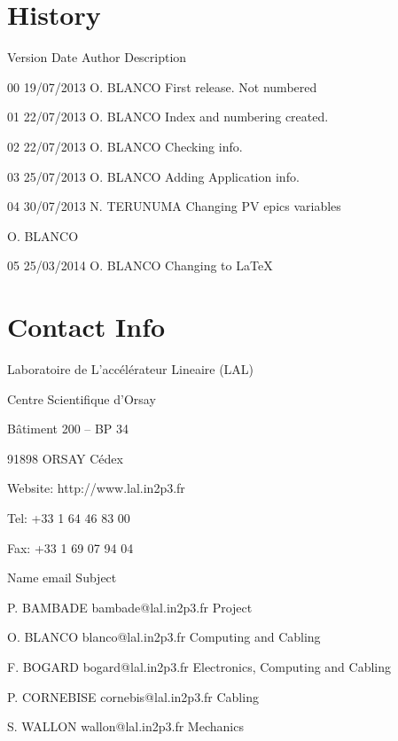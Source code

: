 \documentclass[a4paper,11pt]{book}
\begin{document}
\section{History}
Version	Date			Author		Description\par 
00		19/07/2013	O. BLANCO	First release. Not numbered\par 
01		22/07/2013	O. BLANCO	Index and numbering created.\par 
02		22/07/2013	O. BLANCO	Checking info.\par 
03		25/07/2013	O. BLANCO	Adding Application info.\par 
04		30/07/2013	N. TERUNUMA	Changing PV epics variables\par 
					O. BLANCO\par 
05		25/03/2014	O. BLANCO	Changing to LaTeX\par

\section{Contact Info}
Laboratoire de L'accélérateur Lineaire (LAL)\par 
Centre Scientifique d'Orsay\par 
Bâtiment 200 – BP 34\par 
91898 ORSAY Cédex\par 
Website: http://www.lal.in2p3.fr\par 
Tel: 	+33 1 64 46 83 00\par 
Fax: 	+33 1 69 07 94 04\par 

Name			email				Subject\par 
P. BAMBADE	bambade@lal.in2p3.fr	Project\par 
O. BLANCO		blanco@lal.in2p3.fr	Computing and Cabling\par 
F. BOGARD		bogard@lal.in2p3.fr	Electronics, Computing and Cabling\par 
P. CORNEBISE	cornebis@lal.in2p3.fr	Cabling\par 
S. WALLON		wallon@lal.in2p3.fr	Mechanics\par 
\end{document}

